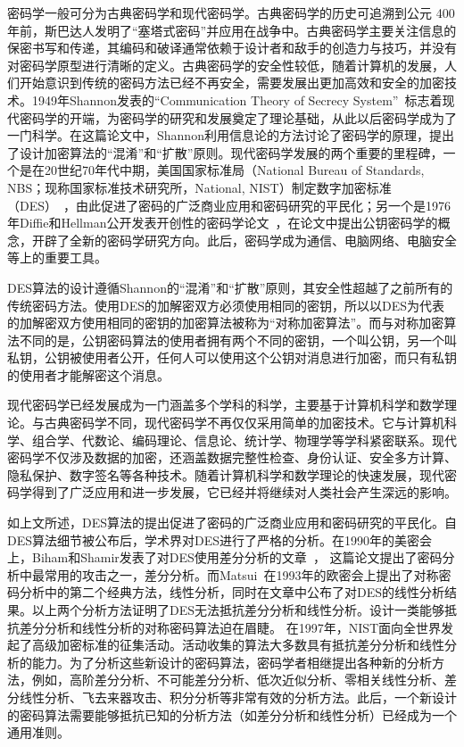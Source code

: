\documentclass[a4paper,zihao=-4,AutoFakeBold]{ctexart}
\begin{document}
密码学一般可分为古典密码学和现代密码学。古典密码学的历史可追溯到公元 400 年前，斯巴达人发明了``塞塔式密码''并应用在战争中。古典密码学主要关注信息的保密书写和传递，其编码和破译通常依赖于设计者和敌手的创造力与技巧，并没有对密码学原型进行清晰的定义。古典密码学的安全性较低，随着计算机的发展，人们开始意识到传统的密码方法已经不再安全，需要发展出更加高效和安全的加密技术。1949年Shannon发表的``Communication Theory of Secrecy System''~\cite{Shannon49}标志着现代密码学的开端，为密码学的研究和发展奠定了理论基础，从此以后密码学成为了一门科学。在这篇论文中，Shannon利用信息论的方法讨论了密码学的原理，提出了设计加密算法的``混淆''和``扩散''原则。现代密码学发展的两个重要的里程碑，一个是在20世纪70年代中期，美国国家标准局（National Bureau of Standards, NBS；现称国家标准技术研究所，National, NIST）制定数字加密标准（DES）~\cite{DES}，由此促进了密码的广泛商业应用和密码研究的平民化；另一个是1976年Diffie和Hellman公开发表开创性的密码学论文~\cite{DiffieHellman}，在论文中提出公钥密码学的概念，开辟了全新的密码学研究方向。此后，密码学成为通信、电脑网络、电脑安全等上的重要工具。

DES算法的设计遵循Shannon的``混淆''和``扩散''原则，其安全性超越了之前所有的传统密码方法。使用DES的加解密双方必须使用相同的密钥，所以以DES为代表的加解密双方使用相同的密钥的加密算法被称为``对称加密算法''。而与对称加密算法不同的是，公钥密码算法的使用者拥有两个不同的密钥，一个叫公钥，另一个叫私钥，公钥被使用者公开，任何人可以使用这个公钥对消息进行加密，而只有私钥的使用者才能解密这个消息。

现代密码学已经发展成为一门涵盖多个学科的科学，主要基于计算机科学和数学理论。与古典密码学不同，现代密码学不再仅仅采用简单的加密技术。它与计算机科学、组合学、代数论、编码理论、信息论、统计学、物理学等学科紧密联系。现代密码学不仅涉及数据的加密，还涵盖数据完整性检查、身份认证、安全多方计算、隐私保护、数字签名等各种技术。随着计算机科学和数学理论的快速发展，现代密码学得到了广泛应用和进一步发展，它已经并将继续对人类社会产生深远的影响。

如上文所述，DES算法的提出促进了密码的广泛商业应用和密码研究的平民化。自DES算法细节被公布后，学术界对DES进行了严格的分析。在1990年的美密会上，Biham和Shamir发表了对DES使用差分分析的文章~\cite{BihamSCRYPTO90}， 这篇论文提出了密码分析中最常用的攻击之一，差分分析。而Matsui~\cite{M94}在1993年的欧密会上提出了对称密码分析中的第二个经典方法，线性分析，同时在文章中公布了对DES的线性分析结果。以上两个分析方法证明了DES无法抵抗差分分析和线性分析。设计一类能够抵抗差分分析和线性分析的对称密码算法迫在眉睫。
在1997年，NIST面向全世界发起了高级加密标准的征集活动。活动收集的算法大多数具有抵抗差分分析和线性分析的能力。为了分析这些新设计的密码算法，密码学者相继提出各种新的分析方法，例如，高阶差分分析、不可能差分分析、低次近似分析、零相关线性分析、差分线性分析、飞去来器攻击、积分分析等非常有效的分析方法。此后，一个新设计的密码算法需要能够抵抗已知的分析方法（如差分分析和线性分析）已经成为一个通用准则。
\end{document}
